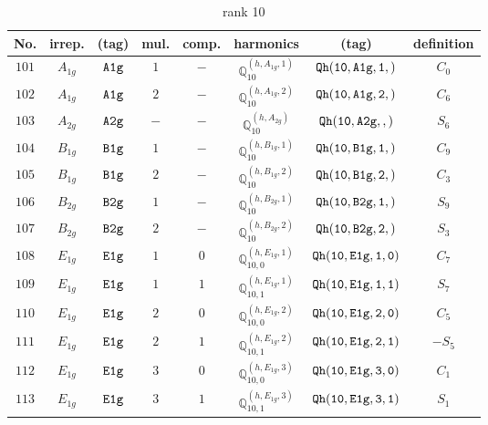 \documentclass[fleqn,8pt]{jsarticle}
\begin{document}
\begin{table}[ht!]
\begin{center}
\caption{rank 10}
\renewcommand{\arraystretch}{1.3}
\begin{tabular}{cccccccc} \hline \hline
No. & irrep. & (tag) & mul. & comp. & harmonics & (tag) & definition \\ \hline
$ 101 $ & $ A_{1g} $ & $ {\tt A1g} $ & $ 1 $ & $ - $ & $ \mathbb{Q}_{10}^{(h,A_{1g},1)} $ & $ {\tt Qh(10,A1g,1,)} $ & $ C_{0} $ \\
$ 102 $ & $ A_{1g} $ & $ {\tt A1g} $ & $ 2 $ & $ - $ & $ \mathbb{Q}_{10}^{(h,A_{1g},2)} $ & $ {\tt Qh(10,A1g,2,)} $ & $ C_{6} $ \\
$ 103 $ & $ A_{2g} $ & $ {\tt A2g} $ & $ - $ & $ - $ & $ \mathbb{Q}_{10}^{(h,A_{2g})} $ & $ {\tt Qh(10,A2g,,)} $ & $ S_{6} $ \\
$ 104 $ & $ B_{1g} $ & $ {\tt B1g} $ & $ 1 $ & $ - $ & $ \mathbb{Q}_{10}^{(h,B_{1g},1)} $ & $ {\tt Qh(10,B1g,1,)} $ & $ C_{9} $ \\
$ 105 $ & $ B_{1g} $ & $ {\tt B1g} $ & $ 2 $ & $ - $ & $ \mathbb{Q}_{10}^{(h,B_{1g},2)} $ & $ {\tt Qh(10,B1g,2,)} $ & $ C_{3} $ \\
$ 106 $ & $ B_{2g} $ & $ {\tt B2g} $ & $ 1 $ & $ - $ & $ \mathbb{Q}_{10}^{(h,B_{2g},1)} $ & $ {\tt Qh(10,B2g,1,)} $ & $ S_{9} $ \\
$ 107 $ & $ B_{2g} $ & $ {\tt B2g} $ & $ 2 $ & $ - $ & $ \mathbb{Q}_{10}^{(h,B_{2g},2)} $ & $ {\tt Qh(10,B2g,2,)} $ & $ S_{3} $ \\
$ 108 $ & $ E_{1g} $ & $ {\tt E1g} $ & $ 1 $ & $ 0 $ & $ \mathbb{Q}_{10,0}^{(h,E_{1g},1)} $ & $ {\tt Qh(10,E1g,1,0)} $ & $ C_{7} $ \\
$ 109 $ & $ E_{1g} $ & $ {\tt E1g} $ & $ 1 $ & $ 1 $ & $ \mathbb{Q}_{10,1}^{(h,E_{1g},1)} $ & $ {\tt Qh(10,E1g,1,1)} $ & $ S_{7} $ \\
$ 110 $ & $ E_{1g} $ & $ {\tt E1g} $ & $ 2 $ & $ 0 $ & $ \mathbb{Q}_{10,0}^{(h,E_{1g},2)} $ & $ {\tt Qh(10,E1g,2,0)} $ & $ C_{5} $ \\
$ 111 $ & $ E_{1g} $ & $ {\tt E1g} $ & $ 2 $ & $ 1 $ & $ \mathbb{Q}_{10,1}^{(h,E_{1g},2)} $ & $ {\tt Qh(10,E1g,2,1)} $ & $ - S_{5} $ \\
$ 112 $ & $ E_{1g} $ & $ {\tt E1g} $ & $ 3 $ & $ 0 $ & $ \mathbb{Q}_{10,0}^{(h,E_{1g},3)} $ & $ {\tt Qh(10,E1g,3,0)} $ & $ C_{1} $ \\
$ 113 $ & $ E_{1g} $ & $ {\tt E1g} $ & $ 3 $ & $ 1 $ & $ \mathbb{Q}_{10,1}^{(h,E_{1g},3)} $ & $ {\tt Qh(10,E1g,3,1)} $ & $ S_{1} $ \\

\end{tabular}
\end{center}
\end{table}
\end{document}
